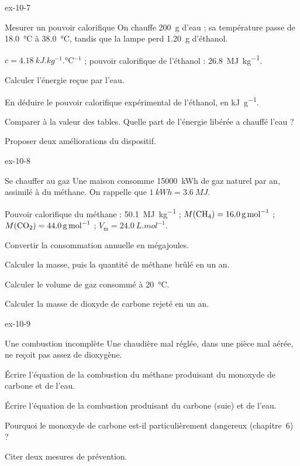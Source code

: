 \begin{blocLivre}{ex-10-7}
\begin{exercice}[2]{Mesurer un pouvoir calorifique}
On chauffe \qty{200}{g} d'eau ; sa température passe de \qty{18,0}{\degreeCelsius} à \qty{38,0}{\degreeCelsius}, tandis que la lampe perd \qty{1,20}{g} d'éthanol.
\begin{donnees}
$c=\qty{4,18}{kJ.kg^{-1}.\degreeCelsius^{-1}}$ ; pouvoir calorifique de l'éthanol : \qty{26,8}{MJ.kg^{-1}}.
\end{donnees}
\begin{questions}
\item Calculer l'énergie reçue par l'eau.
\item En déduire le pouvoir calorifique expérimental de l'éthanol, en \unit{kJ.g^{-1}}.
\item Comparer à la valeur des tables. Quelle part de l'énergie libérée a chauffé l'eau ?
\item Proposer deux améliorations du dispositif.
\end{questions}
\end{exercice}
\end{blocLivre}
\begin{blocLivre}{ex-10-8}
\begin{exercice}[2]{Se chauffer au gaz}
Une maison consomme \qty{15000}{kWh} de gaz naturel par an, assimilé à du méthane. On rappelle que $\qty{1}{kWh}=\qty{3,6}{MJ}$.
\begin{donnees}
Pouvoir calorifique du méthane : \qty{50,1}{MJ.kg^{-1}} ; $M(\ce{CH4})=\qty{16,0}{g.mol^{-1}}$ ; $M(\ce{CO2})=\qty{44,0}{g.mol^{-1}}$ ; $V_\mathrm{m}=\qty{24,0}{L.mol^{-1}}$.
\end{donnees}
\begin{questions}
\item Convertir la consommation annuelle en mégajoules.
\item Calculer la masse, puis la quantité de méthane brûlé en un an.
\item Calculer le volume de gaz consommé à \qty{20}{\degreeCelsius}.
\item Calculer la masse de dioxyde de carbone rejeté en un an.
\end{questions}
\end{exercice}
\end{blocLivre}
\begin{blocLivre}{ex-10-9}
\begin{exercice}[2]{Une combustion incomplète}
Une chaudière mal réglée, dans une pièce mal aérée, ne reçoit pas assez de dioxygène.
\begin{questions}
\item Écrire l'équation de la combustion du méthane produisant du monoxyde de carbone et de l'eau.
\item Écrire l'équation de la combustion produisant du carbone (suie) et de l'eau.
\item Pourquoi le monoxyde de carbone est-il particulièrement dangereux (chapitre~6) ?
\item Citer deux mesures de prévention.
\end{questions}
\end{exercice}
\end{blocLivre}
